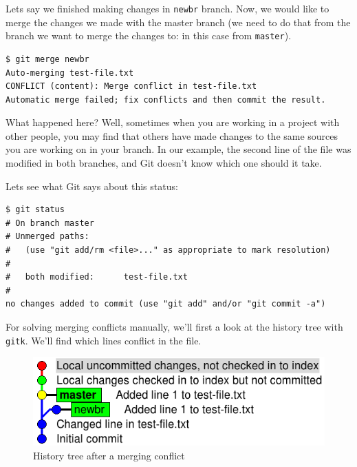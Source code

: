 \documentclass[a4paper,10pt]{article}
\newenvironment{terminal}
  {
    \vspace{+10pt}
    \begin{center}
    \begin{minipage}{0.95\textwidth}
    \begin{framed}
  }
  {
    \end{framed}
    \end{minipage}
    \end{center}
    \vspace{+10pt}
  }
\begin{document}
Lets say we finished making changes in \texttt{newbr} branch. Now, we
would like to merge the changes we made with the master branch (we
need to do that from the branch we want to merge the changes to: in
this case from \texttt{master}).

\begin{terminal}
\begin{verbatim}
$ git merge newbr
Auto-merging test-file.txt
CONFLICT (content): Merge conflict in test-file.txt
Automatic merge failed; fix conflicts and then commit the result.
\end{verbatim}%
\end{terminal}

What happened here? Well, sometimes when you are working in a project
with other people, you may find that others have made changes to the
same sources you are working on in your branch. In our example, the
second line of the file was modified in both branches, and Git doesn't
know which one should it take.

Lets see what Git says about this status:

\begin{terminal}
\begin{verbatim}
$ git status
# On branch master
# Unmerged paths:
#   (use "git add/rm <file>..." as appropriate to mark resolution)
#
#	both modified:      test-file.txt
#
no changes added to commit (use "git add" and/or "git commit -a")
\end{verbatim}%
\end{terminal}

For solving merging conflicts manually, we'll first a look at the
history tree with \texttt{gitk}. We'll find which lines conflict in
the file.

\begin{figure}[h]
  \begin{center}
    \includegraphics[scale=0.5]{git_example-07}
  \end{center}
  \caption{History tree after a merging conflict}
\end{figure}
\end{document}
